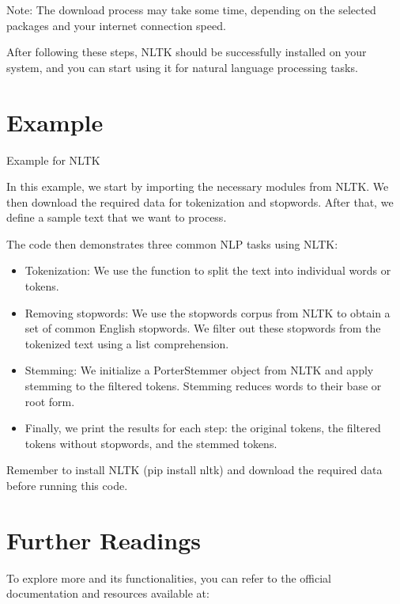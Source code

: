 Note: The download process may take some time, depending on the selected packages and your internet connection speed. 

\bigskip

After following these steps, NLTK should be successfully installed on your system, and you can start using it for natural language processing tasks. 


\section{Example}

\begin{code}  
  

  \caption{Example for NLTK}
\end{code}

In this example, we start by importing the necessary modules from NLTK. We then download the required data for tokenization and stopwords. After that, we define a sample text that we want to process.  

\bigskip


The code then demonstrates three common NLP tasks using NLTK:  

\begin{itemize}
  \item Tokenization: We use the function  to split the text into individual words or tokens. 
  \item Removing stopwords: We use the stopwords corpus from NLTK to obtain a set of common English stopwords. We filter out these stopwords from the tokenized text using a list comprehension.
  \item Stemming: We initialize a PorterStemmer object from NLTK and apply stemming to the filtered tokens. Stemming reduces words to their base or root form. 
  \item Finally, we print the results for each step: the original tokens, the filtered tokens without stopwords, and the stemmed tokens.  
\end{itemize}

Remember to install NLTK (pip install nltk) and download the required data before running this code. 

\section{Further Readings}

To explore more and its functionalities, you can refer to the official documentation and resources available at:

